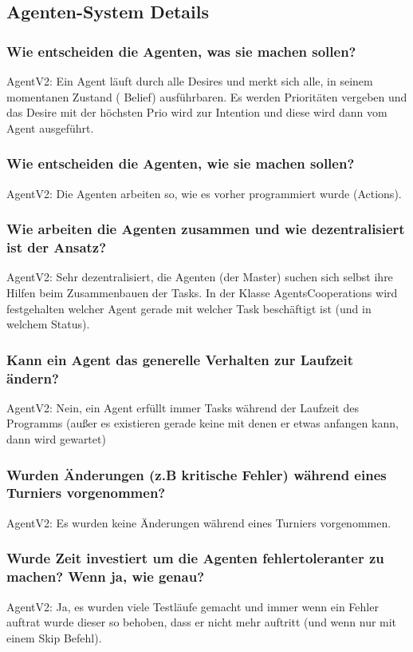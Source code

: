 \documentclass[runningheads]{llncs}
\begin{document}
\subsection{Agenten-System Details}
\subsubsection{Wie entscheiden die Agenten, was sie machen sollen?\\}
AgentV2: Ein Agent läuft durch alle Desires und merkt sich alle, in seinem momentanen Zustand ( Belief) ausführbaren. Es werden Prioritäten vergeben und das Desire mit der höchsten Prio wird zur Intention und diese wird dann vom Agent ausgeführt.
\subsubsection{Wie entscheiden die Agenten, wie sie machen sollen?\\}
AgentV2: Die Agenten arbeiten so, wie es vorher programmiert wurde (Actions). 
\subsubsection{Wie arbeiten die Agenten zusammen und wie dezentralisiert ist der Ansatz?\\}
AgentV2: Sehr dezentralisiert, die Agenten (der Master) suchen sich selbst ihre Hilfen beim Zusammenbauen der Tasks. In der Klasse AgentsCooperations wird festgehalten welcher Agent gerade mit welcher Task beschäftigt ist (und in welchem Status).
\subsubsection{Kann ein Agent das generelle Verhalten zur Laufzeit ändern?\\}
AgentV2: Nein, ein Agent erfüllt immer Tasks während der Laufzeit des Programms (außer es existieren gerade keine mit denen er etwas anfangen kann, dann wird gewartet)
\subsubsection{Wurden Änderungen (z.B kritische Fehler) während eines Turniers vorgenommen?\\}
AgentV2: Es wurden keine Änderungen während eines Turniers vorgenommen.
\subsubsection{Wurde Zeit investiert um die Agenten fehlertoleranter zu machen? Wenn ja, wie genau?\\}
AgentV2: Ja, es wurden viele Testläufe gemacht und immer wenn ein Fehler auftrat wurde dieser so behoben, dass er nicht mehr auftritt (und wenn nur mit einem Skip Befehl).
\end{document}
